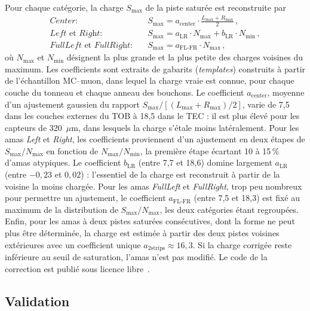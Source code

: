 Pour chaque catégorie, la charge $S_\mathrm{max}$ de la piste saturée est reconstruite par
\begin{align}
    \textit{Center} :\quad & S_\mathrm{max}=a_\mathrm{center}\cdot \frac{L_\mathrm{max}+R_\mathrm{max}}{2} \, , \\
    \textit{Left}\,\,\textrm{et}\,\, \textit{Right} :\quad & S_\mathrm{max}=a_\mathrm{LR} \cdot N_\mathrm{max}+b_\mathrm{LR} \cdot N_\mathrm{min} \, , \\
    \textit{FullLeft}\,\,\textrm{et}\,\, \textit{FullRight} :\quad & S_\mathrm{max}=a_\mathrm{FL\text{-}FR} \cdot N_\mathrm{max} \, ,
\end{align}
où $N_\mathrm{max}$ et $N_\mathrm{min}$ désignent la plus grande et la plus petite des charges voisines du maximum. Les coefficients sont extraits de gabarits (\textit{templates}) construits à partir de l'échantillon MC--muon, dans lequel la charge vraie est connue, pour chaque couche du tonneau et chaque anneau des bouchons. Le coefficient $a_\mathrm{center}$, moyenne d'un ajustement gaussien du rapport $S_\mathrm{max}/[(L_\mathrm{max}+R_\mathrm{max})/2]$, varie de 7,5 dans les couches externes du TOB à 18,5 dans le TEC : il est plus élevé pour les capteurs de 320~$\mu$m, dans lesquels la charge s'étale moins latéralement. Pour les amas \textit{Left} et \textit{Right}, les coefficients proviennent d'un ajustement en deux étapes de $S_\mathrm{max}/N_\mathrm{max}$ en fonction de $N_\mathrm{max}/N_\mathrm{min}$, la première étape écartant 10 à 15\,\% d'amas atypiques. Le coefficient $b_\mathrm{LR}$ (entre 7,7 et 18,6) domine largement $a_\mathrm{LR}$ (entre $-0{,}23$ et $0{,}02$) : l'essentiel de la charge est reconstruit à partir de la voisine la moins chargée. Pour les amas \textit{FullLeft} et \textit{FullRight}, trop peu nombreux pour permettre un ajustement, le coefficient $a_\mathrm{FL\text{-}FR}$ (entre 7,5 et 18,3) est fixé au maximum de la distribution de $S_\mathrm{max}/N_\mathrm{max}$, les deux catégories étant regroupées. Enfin, pour les amas à deux pistes saturées consécutives, dont la forme ne peut plus être déterminée, la charge est estimée à partir des deux pistes voisines extérieures avec un coefficient unique $a_\mathrm{2strips}\approx16{,}3$. Si la charge corrigée reste inférieure au seuil de saturation, l'amas n'est pas modifié. Le code de la correction est publié sous licence libre~\cite{ShapeCorrGit}.

\subsection{Validation}

